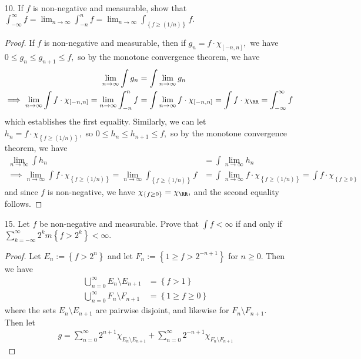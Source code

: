 \documentclass{article}
\begin{document}
\begin{itemize}
	\item[10.] If $f$ is non-negative and measurable, show that $\int_{-\infty}^\infty f = \lim_{n\to\infty} \int_{-n}^n f = \lim_{n\to\infty} \int_{ \left\{f\ge (1/n) \right\}}f.$
		\begin{proof}
			If $f$ is non-negative and measurable, then if $g_n=f\cdot \chi_{[-n, n]},$ we have $0\le g_n\le g_{n+1}\le f,$ so by the monotone convergence theorem, we have
			\begin{align*}
				\lim_{n\to\infty} \int g_n &= \int \lim_{n\to\infty} g_n \\
				\implies \lim_{n\to\infty} \int f\cdot \chi_{[-n, n]} = \lim_{n\to\infty} \int_{-n}^n f &= \int \lim_{n\to\infty} f\cdot \chi_{[-n, n]} = \int f\cdot \chi_{\RR} = \int_{-\infty}^\infty f
			\end{align*}
			which establishes the first equality. Similarly, we can let $h_n=f\cdot \chi_{ \left\{ f\ge(1/n) \right\}},$ so $0\le h_n\le h_{n+1}\le f,$ so by the monotone convergence theorem, we have
			\begin{align*}
				\lim_{n\to\infty}\int h_n &= \int\lim_{n\to\infty} h_n \\
				\implies \lim_{n\to\infty} \int f\cdot \chi_{ \left\{ f\ge (1/n) \right\}} = \lim_{n\to\infty}\int_{ \left\{ f\ge(1/n) \right\}} f &= \int\lim_{n\to\infty} f\cdot \chi_{ \left\{ f\ge (1/n) \right\}} = \int f\cdot \chi_{ \left\{ f\ge 0 \right\}}
			\end{align*}
			and since $f$ is non-negative, we have $\chi_{ \left\{ f\ge 0 \right\}}=\chi_{\RR},$ and the second equality follows.
		\end{proof}

	\item[15.] Let $f$ be non-negative and measurable. Prove that $\int f< \infty$ if and only if $\sum_{k=-\infty}^{\infty} 2^k m\left\{ f>2^k \right\}<\infty.$
		\begin{proof}
			Let $E_n:=\left\{ f > 2^n \right\}$ and let $F_n:=\left\{ 1\ge f> 2^{-n+1} \right\}$ for $n\ge 0.$ Then we have
			\begin{align*}
				\bigcup_{n=0}^\infty E_n\setminus E_{n+1} &= \left\{ f > 1 \right\} \\
				\bigcup_{n=0}^\infty F_n\setminus F_{n+1} &= \left\{ 1\ge f \ge 0 \right\}
			\end{align*}
			where the sets $E_n\setminus E_{n+1}$ are pairwise disjoint, and likewise for $F_n\setminus F_{n+1}.$ Then let
			\begin{align*}
				g = \sum_{n=0}^{\infty} 2^{n+1} \chi_{E_n\setminus E_{n+1}} + \sum_{n=0}^{\infty} 2^{-n+1}\chi_{F_n\setminus F_{n+1}}
			\end{align*}
		\end{proof}


\end{itemize}
\end{document}
